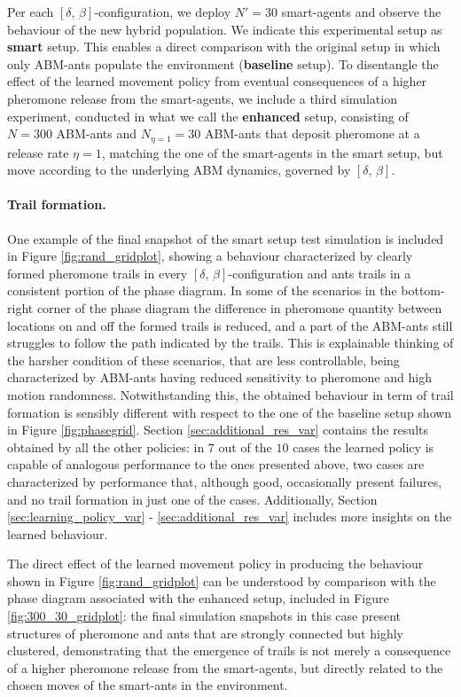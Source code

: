 \documentclass[openacc]{rsproca_new}%
\begin{document}
Per each $\left[ \delta, \, \beta \right]$-configuration, we deploy $N' = 30$ smart-agents and observe the behaviour of the new hybrid population. We indicate this experimental setup as \textbf{smart} setup. This enables a direct comparison with the original setup in which only ABM-ants populate the environment (\textbf{baseline} setup). To disentangle the effect of the learned movement policy from eventual consequences of a higher pheromone release from the smart-agents, we include a third simulation experiment, conducted in what we call the \textbf{enhanced} setup, consisting of $N=300$ ABM-ants and $N_{\eta=1} = 30$ ABM-ants that deposit pheromone at a release rate $\eta = 1$, matching the one of the smart-agents in the smart setup, but move according to the underlying ABM dynamics, governed by $\left[ \delta, \, \beta \right]$.

\paragraph{Trail formation.}%
One example of the final snapshot of the smart setup test simulation is included in Figure \ref{fig:rand_gridplot}, showing a behaviour characterized by clearly formed pheromone trails in every $\left[ \delta, \, \beta \right]$-configuration and ants trails in a consistent portion of the phase diagram. In some of the scenarios in the bottom-right corner of the phase diagram the difference in pheromone quantity between locations on and off the formed trails is reduced, and a part of the ABM-ants still struggles to follow the path indicated by the trails. This is explainable thinking of the harsher condition of these scenarios, that are less controllable, being characterized by ABM-ants having reduced sensitivity to pheromone and high motion randomness. Notwithstanding this, the obtained behaviour in term of trail formation is sensibly different with respect to the one of the baseline setup shown in Figure \ref{fig:phasegrid}.
Section \ref{sec:additional_res_var} contains the results obtained by all the other policies: in $7$ out of the $10$ cases the learned policy is capable of analogous performance to the ones presented above, two cases are characterized by performance that, although good, occasionally present failures, and no trail formation in just one of the cases. Additionally, Section \ref{sec:learning_policy_var} - \ref{sec:additional_res_var} includes more insights on the learned behaviour.

The direct effect of the learned movement policy in producing the behaviour shown in Figure \ref{fig:rand_gridplot} can be understood by comparison with the phase diagram associated with the enhanced setup, included in Figure \ref{fig:300_30_gridplot}: the final simulation snapshots in this case present structures of pheromone and ants that are strongly connected but highly clustered, demonstrating that the emergence of trails is not merely a consequence of a higher pheromone release from the smart-agents, but directly related to the chosen moves of the smart-ants in the environment.\\
\end{document}
